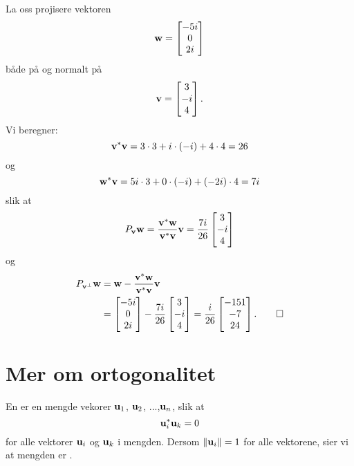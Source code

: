 \begin{ex}
La oss projisere vektoren 
\[
\mathbf{w}=
\begin{bmatrix}
 -5i  \\
 0  \\
2i 
\end{bmatrix}
\]
både på og normalt på
\[
\mathbf{v}=
\begin{bmatrix}
 3 \\
 -i \\
 4
\end{bmatrix}.
\]
Vi beregner:
\[
\mathbf{v}^* \mathbf{v}=3\cdot 3+i\cdot (-i)+4\cdot 4=26
\]
og
\[
\mathbf{w}^* \mathbf{v}=5i\cdot 3+0\cdot (-i)+(-2i)\cdot 4=7i
\]
slik at
\begin{align*}
P_{\mathbf{v}}\mathbf{w} =\frac{ \mathbf{v}^*\mathbf{w}}{\mathbf{v}^* \mathbf{v}} \mathbf{v} =
\frac{7i}{26}
\begin{bmatrix}
 3 \\
 -i \\
 4
\end{bmatrix}
\end{align*}
og 
\begin{align*}
P_{\mathbf{v}^{\perp}}\mathbf{w} &=\mathbf{w}-\frac{ \mathbf{v}^*\mathbf{w}}{\mathbf{v}^* \mathbf{v}} \mathbf{v} \\&= 
\begin{bmatrix}
 -5i  \\
 0  \\
2i 
\end{bmatrix}
-
\frac{7i}{26}
\begin{bmatrix}
 3 \\
 -i \\
 4
\end{bmatrix}
=
\frac{i}{26}
\begin{bmatrix}
 -151 \\
 -7 \\
 24
\end{bmatrix}.\qedhere
\end{align*} 
\end{ex}


\section*{Mer om ortogonalitet}
\begin{defnx}
En  er en mengde vekorer $\mathbf{u}_1$, $\mathbf{u}_2$, ...,$\mathbf{u}_n$, slik at
\[
\mathbf{u}_i^*  \mathbf{u}_k = 0
\]
for alle vektorer $\mathbf{u}_i$ og $\mathbf{u}_k$ i mengden. Dersom $\|\mathbf{u}_i \|=1$ for alle vektorene, sier vi at mengden er .
\end{defnx}


